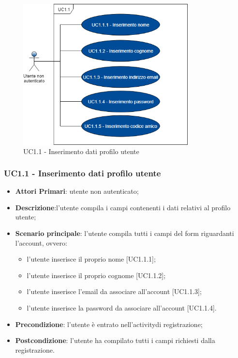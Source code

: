 \begin{figure}
	\includegraphics[width=9cm]{res/images/UC1-1Inserimento.png}
	\centering
	\caption{UC1.1 - Inserimento dati profilo utente}
\end{figure}
\subsubsection{UC1.1 - Inserimento dati profilo utente}
\begin{itemize}
	\item \textbf{Attori Primari}: utente non autenticato;
	\item \textbf{Descrizione}:l'utente compila i campi contenenti i dati relativi al profilo utente;
	\item \textbf{Scenario principale}: l'utente compila tutti i campi del form riguardanti l'account, ovvero:
		\begin{itemize}
			\item l'utente inserisce il proprio nome [UC1.1.1];
			\item l'utente inserisce il proprio cognome [UC1.1.2];
			\item l'utente inserisce l'email da associare all'account [UC1.1.3];
			\item l'utente inserisce la password da associare all'account [UC1.1.4].
		\end{itemize}
	\item \textbf{Precondizione}: l'utente è entrato nell'activity\glosp di registrazione;
	\item \textbf{Postcondizione}: l'utente ha compilato tutti i campi richiesti dalla registrazione.
\end{itemize}
\newpage
